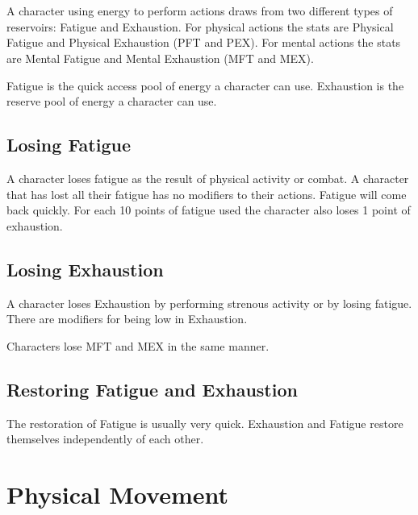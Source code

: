 

\section{}

A character using energy to perform actions draws from two different 
types of reservoirs: Fatigue and Exhaustion. For physical actions the 
stats are Physical Fatigue and Physical Exhaustion (PFT and PEX). For mental
actions the stats are Mental Fatigue and Mental Exhaustion (MFT and MEX).

Fatigue is the quick access pool of energy a character can use.
Exhaustion is the reserve pool of energy a character can use. 

\subsection{Losing Fatigue}

A character loses fatigue as the result of physical activity or combat. 
A character that has lost all their fatigue has no modifiers to their actions.
Fatigue will come back quickly. For each 10 points of fatigue used the character 
also loses 1 point of exhaustion.

\subsection{Losing Exhaustion}
A character loses Exhaustion by performing strenous activity or by losing 
fatigue. There are modifiers for being low in Exhaustion.



Characters lose MFT and MEX in the same manner.



\subsection{Restoring Fatigue and Exhaustion}

The restoration of Fatigue is usually very quick. Exhaustion and Fatigue
restore themselves independently of each other.



\section{Physical Movement}


